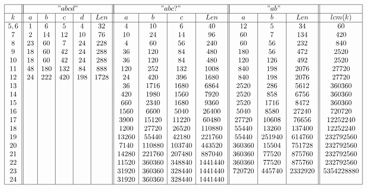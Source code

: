 \documentclass[utf8]{article}
\begin{document}
	\begin{table}
		\label{idSk}
		\arraycolsep=2pt
		$$
		\begin{array}{|c||c|c|c|c|c||c|c|c|c||c|c|c||c|}
		\hline
		&\multicolumn{5}{|c||}{"abcd"}
		&\multicolumn{4}{|c||}{{"abc?"}}
		&\multicolumn{3}{|c||}{{"ab"}}&\\
		\hline
		k&a&b&c&d&{Len}&a&b&c&{Len}&a&b&{Len}&lcm(k)\\
		\hline
		5,6&1&6&5&4&32&4&10&6&40&12&5&34&60\\
		7&2&14&12&10&76&10&24&14&96&60&7&134&420\\
		8&23&60&7&24&228&4&60&56&240&60&56&232&840\\
		9&18&60&42&24&288&36&120&84&480&180&56&472&2520\\
		10&18&60&42&24&288&36&120&84&480&120&126&492&2520\\
		11&48&180&132&84&888&120&252&132&1008&840&198&2076&27720\\
		12&24&222&420&198&1728&24&420&396&1680&840&198&2076&27720\\
		13&&&&&&36&1716&1680&6864&2520&286&5612&360360\\
		14&&&&&&420&1980&1560&7920&2520&858&6756&360360\\
		15&&&&&&660&2340&1680&9360&2520&1716&8472&360360\\
		16&&&&&&1560&6600&5040&26400&5040&8580&27240&720720\\
		17&&&&&&3900&15120&11220&60480&27720&10608&76656&12252240\\
		18&&&&&&1200&27720&26520&110880&55440&13260&137400&12252240\\
		19&&&&&&13260&55440&42180&221760&55440&251940&614760&232792560\\
		20&&&&&&7140&110880&103740&443520&360360&15504&751728&232792560\\
		21&&&&&&14280&221760&207480&887040&360360&77520&875760&232792560\\
		22&&&&&&11520&360360&348840&1441440&360360&77520&875760&232792560\\
		23&&&&&&31920&360360&328440&1441440&720720&445740&2332920&5354228880\\
		24&&&&&&31920&360360&328440&1441440&&&&\\
		\hline
		\end{array}
		$$
	\end{table}
\end{document}
